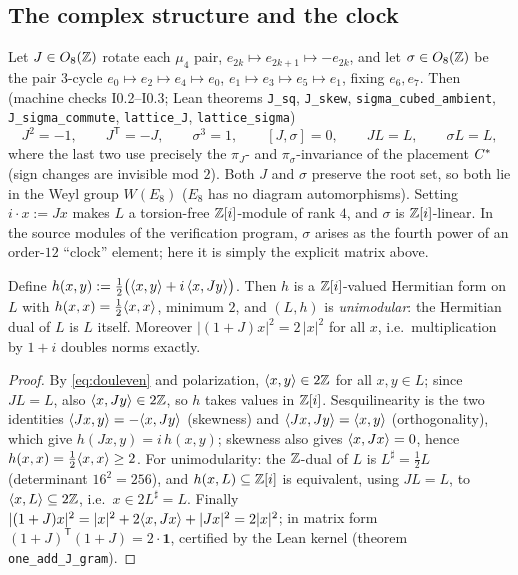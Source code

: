 \subsection{The complex structure and the clock}
Let $J\in O_8(\mathbb Z)$ rotate each $\mu_4$ pair,
$e_{2k}\mapsto e_{2k+1}\mapsto-e_{2k}$, and let $\sigma\in O_8(\mathbb Z)$
be the pair $3$-cycle $e_0\mapsto e_2\mapsto e_4\mapsto e_0$,
$e_1\mapsto e_3\mapsto e_5\mapsto e_1$, fixing $e_6,e_7$.  Then
(machine checks I0.2--I0.3; Lean theorems \texttt{J\_sq},
\texttt{J\_skew}, \texttt{sigma\_cubed\_ambient},
\texttt{J\_sigma\_commute}, \texttt{lattice\_J},
\texttt{lattice\_sigma})
\[
J^2=-1,\qquad J^{\mathsf T}=-J,\qquad \sigma^3=1,\qquad
[J,\sigma]=0,\qquad JL=L,\qquad \sigma L=L ,
\]
where the last two use precisely the $\pi_J$- and
$\pi_\sigma$-invariance of the placement $C^{*}$ (sign changes are
invisible mod $2$).  Both $J$ and $\sigma$ preserve the root set, so
both lie in the Weyl group $W(E_8)$ ($E_8$ has no diagram
automorphisms).  Setting $i\cdot x:=Jx$ makes $L$ a torsion-free
$\mathbb Z[i]$-module of rank $4$, and $\sigma$ is $\mathbb Z[i]$-linear.  In the
source modules of the verification program, $\sigma$ arises as the
fourth power of an order-$12$ ``clock'' element; here it is simply
the explicit matrix above.

\begin{lemma}\label{lem:herm}
Define $h(x,y):=\tfrac12\bigl(\langle x,y\rangle+i\,\langle x,Jy\rangle\bigr)$.  Then $h$ is
a $\mathbb Z[i]$-valued Hermitian form on $L$ with $h(x,x)=\tfrac12\langle x,x\rangle$,
minimum $2$, and $(L,h)$ is \emph{unimodular}: the Hermitian dual of
$L$ is $L$ itself.  Moreover $|(1+J)x|^2=2\,|x|^2$ for all $x$, i.e.\
multiplication by $1+i$ doubles norms exactly.
\end{lemma}

\begin{proof}
By \eqref{eq:douleven} and polarization, $\langle x,y\rangle\in2\mathbb Z$ for all
$x,y\in L$; since $JL=L$, also $\langle x,Jy\rangle\in2\mathbb Z$, so $h$ takes values
in $\mathbb Z[i]$.  Sesquilinearity is the two identities
$\langle Jx,y\rangle=-\langle x,Jy\rangle$ (skewness) and $\langle Jx,Jy\rangle=\langle x,y\rangle$
(orthogonality), which give $h(Jx,y)=i\,h(x,y)$; skewness also gives
$\langle x,Jx\rangle=0$, hence $h(x,x)=\tfrac12\langle x,x\rangle\ge2$.  For unimodularity:
the $\mathbb Z$-dual of $L$ is $L^{\sharp}=\tfrac12L$ (determinant
$16^2=256$), and $h(x,L)\subseteq\mathbb Z[i]$ is equivalent, using $JL=L$,
to $\langle x,L\rangle\subseteq2\mathbb Z$, i.e.\ $x\in2L^{\sharp}=L$.  Finally
$|(1+J)x|^2=|x|^2+2\langle x,Jx\rangle+|Jx|^2=2|x|^2$; in matrix form
$(1+J)^{\mathsf T}(1+J)=2\cdot\mathbf 1$, certified by the Lean kernel
(theorem \texttt{one\_add\_J\_gram}).
\end{proof}

